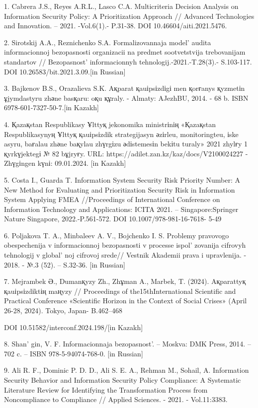 \begin{references}
1. Cabrera J.S., Reyes A.R.L., Lasco C.A. Multicriteria Decision Analysis
on Information Security Policy: A Prioritization Approach // Advanced
Technologies and Innovation. -- 2021. -Vol.6(1).- P.31-38. DOI
10.46604/aiti.2021.5476.

2. Sirotskij A.A., Reznichenko S.A. Formalizovannaja
model'{} audita informacionnoj bezopasnosti organizacii
na predmet sootvetstvija trebovanijam standartov //
Bezopasnost'{} informacionnyh tehnologij.-2021.-T.28(3).-
S.103-117. DOI 10.26583/bit.2021.3.09.{[}in Russian{]}

3. Bajkenov B.S., Orazalieva S.K. Aқparat қauіpsіzdіgі men қorғanys
қyzmetіn ұjymdastyru zhәne basқaru: oқu құraly. - Almaty: AJezhBU, 2014.
- 68 b. ISBN 6978-601-7327-50-7.{[}in Kazakh{]}

4. Қazaқstan Respublikasy Ұlttyқ jekonomika ministrіnің «Қazaқstan
Respublikasynyң Ұlttyқ қauіpsіzdіk strategijasyn әzіrleu, monitoringteu,
іske asyru, baғalau zhәne baқylau zhүrgіzu әdіstemesіn bekіtu turaly»
2021 zhylғy 1 қyrkүjektegі № 82 bұjryғy. URL:
https://adilet.zan.kz/kaz/docs/V2100024227 - Zhүgіngen kүnі: 09.01.2024.
{[}in Kazakh{]}

5. Costa I., Guarda T. Information System Security Risk Priority Number:
A New Method for Evaluating and Prioritization Security Risk in
Information System Applying FMEA //Proceedings of International
Conference on Information Technology and Applications: ICITA 2021. --
Singapore:Springer Nature Singapore, 2022.-P.561-572. DOI
10.1007/978-981-16-7618- 5-49

6. Poljakova T. A., Minbaleev A. V., Bojchenko I. S. Problemy pravovogo
obespechenija v informacionnoj bezopasnosti v processe
ispol' zovanija cifrovyh tehnologij v
global' noj cifrovoj srede// Vestnik Akademii prava i
upravlenija. - 2018. - №.3 (52). -- S.32-36. {[}in Russian{]}

7. Mejrambek Ә., Dumanқyzy Zh., Zhұman A., Marbek, T. (2024). Aқparattyқ
қauіpsіzdіktің maңyzy // Proceedings of the15thInternational Scientific
and Practical Conference «Scientific Horizon in the Context of Social
Crises» (April 26-28, 2024). Tokyo, Japan- B.462--468

DOI 10.51582/interconf.2024.198/{[}in Kazakh{]}

8. Shan' gin, V. F. Informacionnaja
bezopasnost'. -- Moskva: DMK Press, 2014. -- 702 c. --
ISBN 978-5-94074-768-0. {[}in Russian{]}

9. Ali R. F., Dominic P. D. D., Ali S. E. A., Rehman M., Sohail, A.
Information Security Behavior and Information Security Policy
Compliance: A Systematic Literature Review for Identifying the
Transformation Process from Noncompliance to Compliance // Applied
Sciences. - 2021. - Vol.11:3383.
\href{https://doi.org/10.3390/app11083383}{}


\end{references}
